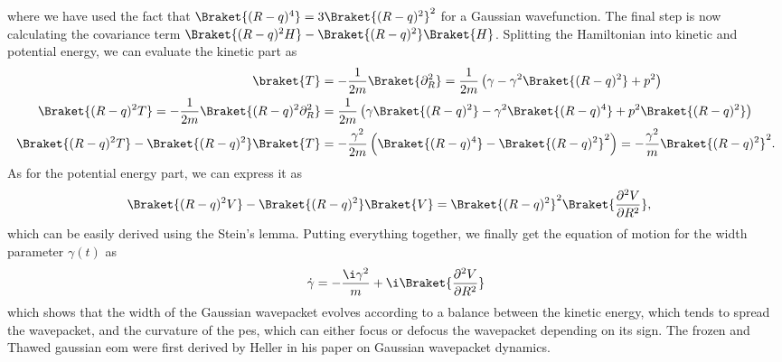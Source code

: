 where we have used the fact that $\Braket{(R-q)^4}=3\Braket{(R-q)^2}^2$ for a Gaussian wavefunction. The final step is now calculating the covariance term $\Braket{(R-q)^2H}-\Braket{(R-q)^2}\Braket{H}$. Splitting the Hamiltonian into kinetic and potential energy, we can evaluate the kinetic part as
\begin{align}
\braket{T}&=-\frac{1}{2m}\Braket{\partial_R^2}=\frac{1}{2m}\left(\gamma-\gamma^2\Braket{(R-q)^2}+p^2\right)\\
\Braket{(R-q)^2T}=-\frac{1}{2m}\Braket{(R-q)^2\partial_R^2}&=\frac{1}{2m}\left(\gamma\Braket{(R-q)^2}-\gamma^2\Braket{(R-q)^4}+p^2\Braket{(R-q)^2}\right)\\
\Braket{(R-q)^2T}-\Braket{(R-q)^2}\Braket{T}&=-\frac{\gamma^2}{2m}\left(\Braket{(R-q)^4}-\Braket{(R-q)^2}^2\right)=-\frac{\gamma^2}{m}\Braket{(R-q)^2}^2.
\end{align}
As for the potential energy part, we can express it as
\begin{align}
\Braket{(R-q)^2V}-\Braket{(R-q)^2}\Braket{V}&=\Braket{(R-q)^2}^2\Braket{\frac{\partial^2 V}{\partial R^2}},
\end{align}
which can be easily derived using the Stein's lemma. Putting everything together, we finally get the equation of motion for the width parameter $\gamma(t)$ as
\begin{equation}
\dot\gamma=-\frac{\i\gamma^2}{m}+\i\Braket{\frac{\partial^2 V}{\partial R^2}}
\end{equation}
which shows that the width of the Gaussian wavepacket evolves according to a balance between the kinetic energy, which tends to spread the wavepacket, and the curvature of the \acrshort{pes}, which can either focus or defocus the wavepacket depending on its sign. The frozen and Thawed gaussian \acrshort{eom} were first derived by Heller in his paper on Gaussian wavepacket dynamics.~\cite{10.1063/1.430620}
